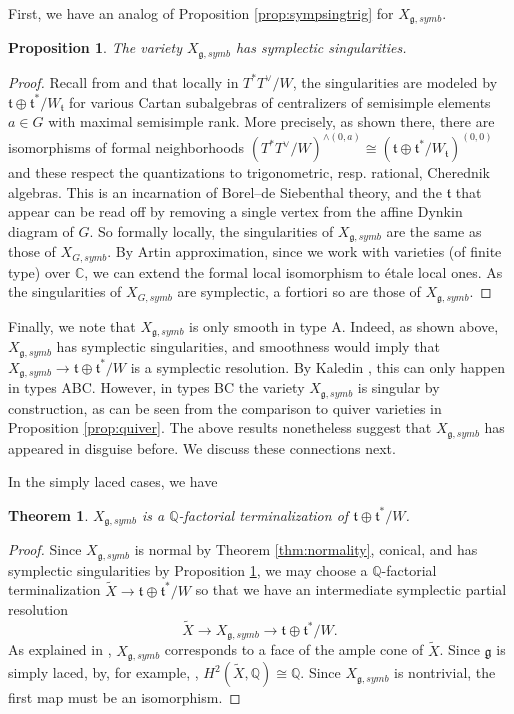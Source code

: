 \documentclass{amsart}
\numberwithin{equation}{section}
\newtheorem{theorem}[lemma]{Theorem}%
\newtheorem{proposition}[lemma]{Proposition}%
\theoremstyle{definition}
\newcommand{\fg}{\mathfrak{g}}
\newcommand{\ft}{\mathfrak{t}}
\newcommand{\C}{{\mathbb C}}
\newcommand{\Q}{{\mathbb Q}}
\begin{document}
First, we have an analog of Proposition \ref{prop:sympsingtrig} for $X_{\fg,symb}$. 
\begin{proposition}
\label{prop:sympsingrat}
The variety $X_{\fg,symb}$ has symplectic singularities.
\end{proposition}
\begin{proof}
Recall from \cite[Section 3]{GKO} and \cite{Etingof} that locally in $T^*T^\vee/W$, the singularities are modeled by $\ft\oplus \ft^*/W_{\ft}$ for various Cartan subalgebras of centralizers of semisimple elements $a\in G$ with maximal semisimple rank. More precisely, as shown there, there are isomorphisms of formal neighborhoods $(T^*T^\vee/W)^{\wedge (0,a)}\cong (\ft\oplus \ft^*/W_{\ft})^{(0,0)}$ and these respect the quantizations to trigonometric, resp. rational, Cherednik algebras. This is an incarnation of Borel--de Siebenthal theory, and the $\ft$ that appear can be read off by removing a single vertex from the affine Dynkin diagram of $G$. So formally locally, the singularities of $X_{\fg,symb}$ are the same as those of $X_{G,symb}$.
By Artin approximation, since we work with varieties (of finite type) over $\C$, we can extend the formal local isomorphism to \'etale local ones.
As the singularities of $X_{G,symb}$ are symplectic, a fortiori so are those of $X_{\fg, symb}$.
 \end{proof}

Finally, we note that $X_{\fg,symb}$ is only smooth in type A. Indeed, as shown above, $X_{\fg,symb}$ has symplectic singularities, and smoothness would imply that $X_{\fg,symb}\to \ft\oplus \ft^*/W$ is a symplectic resolution. By Kaledin \cite{Kaledin}, this can only happen in types ABC. However, in types BC the variety $X_{\fg,symb}$ is singular by construction, as can be seen from the comparison to quiver varieties in Proposition \ref{prop:quiver}. The above results nonetheless suggest that $X_{\fg,symb}$ has appeared in disguise before. We discuss these connections next.

In the simply laced cases, we have
\begin{theorem}
\label{thm:qfact}
$X_{\fg,symb}$ is a $\Q$-factorial terminalization of $\ft\oplus \ft^*/W$. 
\end{theorem}
\begin{proof}
Since $X_{\fg,symb}$ is normal by Theorem \ref{thm:normality}, conical, and has symplectic singularities by Proposition \ref{prop:sympsingrat}, we may choose a $\Q$-factorial terminalization $\widetilde{X}\to \ft\oplus\ft^*/W$ so that we have an intermediate symplectic partial resolution 
$$\widetilde{X}\to X_{\fg,symb}\to \ft\oplus\ft^*/W.$$ As explained in \cite[Proof of Proposition 2.1]{BAL}, $X_{\fg,symb}$ corresponds to a face of the ample cone of $\widetilde{X}$. Since $\fg$ is simply laced, by, for example, \cite{BellamyCounts}, $H^2(\widetilde{X},\Q)\cong \Q$. Since $X_{\fg,symb}$ is nontrivial, the first map must be an isomorphism.
\end{proof}
\end{document}
